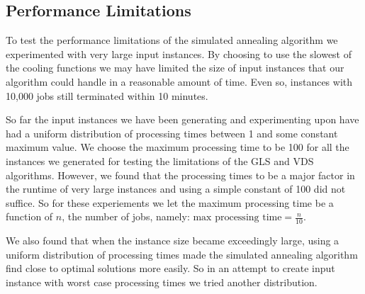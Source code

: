 \documentclass[12pt,a4paper,reqno]{article}
\begin{document}
\subsection{Performance Limitations}
To test the performance limitations of the simulated annealing algorithm we experimented with very large input instances. By choosing to use the slowest of the cooling functions we may have limited the size of input instances that our algorithm could handle in a reasonable amount of time. Even so, instances with 10,000 jobs still terminated within 10 minutes.

So far the input instances we have been generating and experimenting upon have had a uniform distribution of processing times between 1 and some constant maximum value. We choose the maximum processing time to be 100 for all the instances we generated for testing the limitations of the GLS and VDS algorithms. However, we found that the processing times to be a major factor in the runtime of very large instances and using a simple constant of 100 did not suffice. So for these experiements we let the maximum processing time be a function of $n$, the number of jobs, namely: $\text{max processing time}=\frac{n}{10}$.

We also found that when the instance size became exceedingly large, using a uniform distribution of processing times made the simulated annealing algorithm find close to optimal solutions more easily. So in an attempt to create input instance with worst case processing times we tried another distribution.
\end{document}
